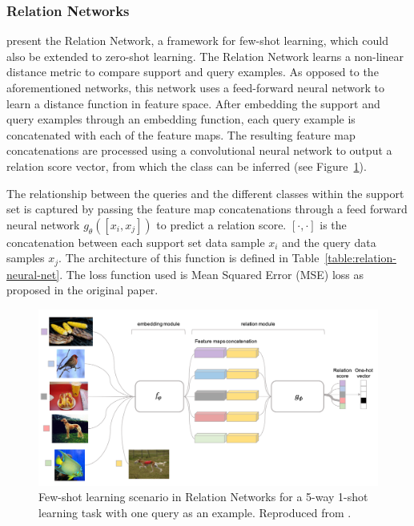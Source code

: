 \subsubsection{Relation Networks}

\citet{sung2018learning} present the Relation Network, a framework for few-shot learning, which could also be extended to zero-shot learning. The Relation Network learns a non-linear distance metric to compare support and query examples. As opposed to the aforementioned networks, this network uses a feed-forward neural network to learn a distance function in feature space. After embedding the support and query examples through an embedding function, each query example is concatenated with each of the feature maps. The resulting feature map concatenations are processed using a convolutional neural network to output a relation score vector, from which the class can be inferred (see Figure~\ref{fig:relationnets}).

The relationship between the queries and the different classes within the support set is captured by passing the feature map concatenations through a feed forward neural network $g_\theta([x_i, x_j])$ to predict a relation score. $[\cdot,\cdot]$ is the concatenation between each support set data sample $x_i$ and the query data samples $x_j$. The architecture of this function is defined in Table~\ref{table:relation-neural-net}. The loss function used is Mean Squared Error (MSE) loss as proposed in the original paper.

\begin{figure}[h]
	\centering
	\includegraphics[width=0.9\linewidth]{img/relation-nets.png}
	\caption[Relation Networks]{Few-shot learning scenario in Relation Networks for a 5-way 1-shot learning task with one query as an example. Reproduced from \citet{sung2018learning}.}
	\label{fig:relationnets}
\end{figure}

